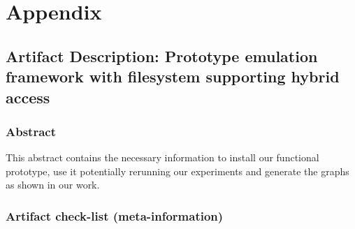 
\chapter*{Appendix} %
%

\section{Artifact Description: Prototype emulation framework with
filesystem supporting hybrid access}

\subsection{Abstract}

This abstract contains the necessary information to install our functional
prototype, use it potentially rerunning our experiments and generate the
graphs as shown in our work.

\subsection{Artifact check-list (meta-information)}

